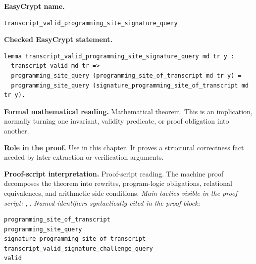 \begin{formaltheorem}
\noindent\textbf{EasyCrypt name.}
\begin{lstlisting}[language=EasyCrypt,basicstyle=\ttfamily\scriptsize]
transcript_valid_programming_site_signature_query
\end{lstlisting}
\noindent\textbf{Checked EasyCrypt statement.}
\begin{lstlisting}[language=EasyCrypt,basicstyle=\ttfamily\scriptsize]
lemma transcript_valid_programming_site_signature_query md tr y :
  transcript_valid md tr =>
  programming_site_query (programming_site_of_transcript md tr y) =
  programming_site_query (signature_programming_site_of_transcript md tr y).
\end{lstlisting}
\noindent\textbf{Formal mathematical reading.}
Mathematical theorem. This is an implication, normally turning one invariant, validity predicate, or proof obligation into another.

\noindent\textbf{Role in the proof.}
Use in this chapter. It proves a structural correctness fact needed by later extraction or verification arguments.

\noindent\textbf{Proof-script interpretation.}
Proof-script reading. The machine proof decomposes the theorem into rewrites, program-logic obligations, relational equivalences, and arithmetic side conditions.
\emph{Main tactics visible in the proof script:} , .
\emph{Named identifiers syntactically cited in the proof block:}
\begin{lstlisting}[language=EasyCrypt,basicstyle=\ttfamily\scriptsize]
programming_site_of_transcript
programming_site_query
signature_programming_site_of_transcript
transcript_valid_signature_challenge_query
valid
\end{lstlisting}

\end{formaltheorem}

